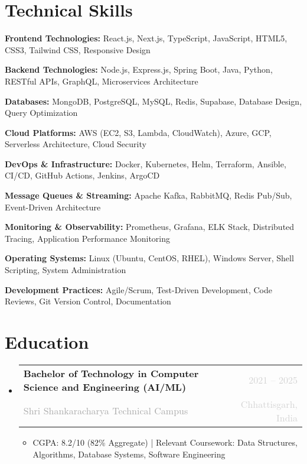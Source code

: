 \documentclass[letterpaper,11pt]{article}
\makeatletter
\newcommand{\resumeItem}[1]{\item\small{#1 \vspace{-2pt}}}
\newcommand{\resumeSubheading}[4]{
  \vspace{-1pt}\item
    \begin{tabular*}{0.97\textwidth}[t]{l@{\extracolsep{\fill}}r}
      \textbf{#1} & \textcolor{lightgray}{\small #2} \\
      \textcolor{darkgray}{\small#3} & \textcolor{lightgray}{\small #4} \\
    \end{tabular*}\vspace{-7pt}
}
\newcommand{\resumeSubHeadingListStart}{\begin{itemize}[leftmargin=0.15in, label={}]}
\newcommand{\resumeSubHeadingListEnd}{\end{itemize}}
\newcommand{\resumeItemListStart}{\begin{itemize}[leftmargin=0.15in]}
\newcommand{\resumeItemListEnd}{\end{itemize}\vspace{-5pt}}
\makeatother
\begin{document}
\section{Technical Skills}
\begin{itemize}[leftmargin=0.15in, label={}]
\small{
    \item \textbf{Frontend Technologies:} React.js, Next.js, TypeScript, JavaScript, HTML5, CSS3, Tailwind CSS, Responsive Design
    \item \textbf{Backend Technologies:} Node.js, Express.js, Spring Boot, Java, Python, RESTful APIs, GraphQL, Microservices Architecture
    \item \textbf{Databases:} MongoDB, PostgreSQL, MySQL, Redis, Supabase, Database Design, Query Optimization
    \item \textbf{Cloud Platforms:} AWS (EC2, S3, Lambda, CloudWatch), Azure, GCP, Serverless Architecture, Cloud Security
    \item \textbf{DevOps \& Infrastructure:} Docker, Kubernetes, Helm, Terraform, Ansible, CI/CD, GitHub Actions, Jenkins, ArgoCD
    \item \textbf{Message Queues \& Streaming:} Apache Kafka, RabbitMQ, Redis Pub/Sub, Event-Driven Architecture
    \item \textbf{Monitoring \& Observability:} Prometheus, Grafana, ELK Stack, Distributed Tracing, Application Performance Monitoring
    \item \textbf{Operating Systems:} Linux (Ubuntu, CentOS, RHEL), Windows Server, Shell Scripting, System Administration
    \item \textbf{Development Practices:} Agile/Scrum, Test-Driven Development, Code Reviews, Git Version Control, Documentation
}
\end{itemize}

\section{Education}
\resumeSubHeadingListStart
\resumeSubheading
{Bachelor of Technology in Computer Science and Engineering (AI/ML)}{2021 -- 2025}
{Shri Shankaracharya Technical Campus}{Chhattisgarh, India}
\resumeItemListStart
\resumeItem{CGPA: 8.2/10 (82\% Aggregate) | Relevant Coursework: Data Structures, Algorithms, Database Systems, Software Engineering}
\resumeItemListEnd
\resumeSubHeadingListEnd

\end{document}

